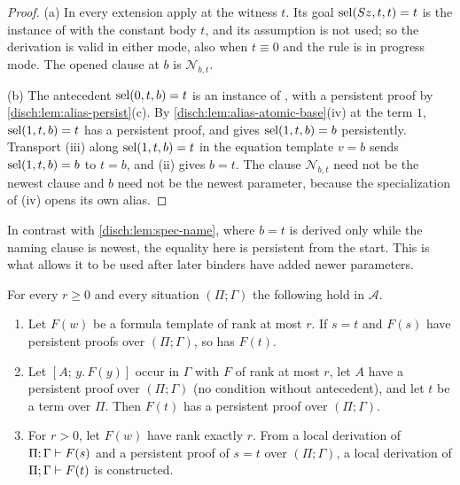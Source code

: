 \begin{proof}
(a) In every extension apply  at the witness $t$. Its goal
$\operatorname{sel}(S z,t,t)=t$ is the instance of  with the constant
body $t$, and its assumption is not used; so the derivation is valid in
either mode, also when $t\equiv 0$ and the rule is in progress mode. The
opened clause at $b$ is $\mathcal N_{b,t}$.

(b) The antecedent $\operatorname{sel}(0,t,b)=t$ is an instance of , with a
persistent proof by \cref{disch:lem:alias-persist}(c). By
\cref{disch:lem:alias-atomic-base}(iv) at the term $1$,
$\operatorname{sel}(1,t,b)=t$ has a persistent proof, and  gives
$\operatorname{sel}(1,t,b)=b$ persistently. Transport (iii) along $\operatorname{sel}(1,t,b)=t$ in the
equation template $v=b$ sends $\operatorname{sel}(1,t,b)=b$ to $t=b$, and (ii) gives
$b=t$. The clause $\mathcal N_{b,t}$ need not be the newest clause and $b$
need not be the newest parameter, because the specialization of (iv) opens
its own alias.
\end{proof}

In contrast with \cref{disch:lem:spec-name}, where $b=t$ is derived only
while the naming clause is newest, the equality here is persistent from the
start. This is what allows it to be used after later binders have added
newer parameters.

\begin{theorem}
\label{disch:thm:alias-rank}
For every $r\geq 0$ and every situation $(\Pi;\Gamma)$ the following hold
in $\mathcal A$.
\begin{enumerate}[label=\textup{(\alph*)}]
\item[$(\mathrm T_r)$] Let $F(w)$ be a formula template of rank at most
 $r$. If $s=t$ and $F(s)$ have persistent proofs over $(\Pi;\Gamma)$, so
 has $F(t)$.
\item[$(\mathrm S_r)$] Let $[A;\,y.\,F(y)]$ occur in $\Gamma$ with $F$ of
 rank at most $r$, let $A$ have a persistent proof over $(\Pi;\Gamma)$
 (no condition without antecedent), and let $t$ be a term over $\Pi$. Then
 $F(t)$ has a persistent proof over $(\Pi;\Gamma)$.
\item[$(\mathrm L_r)$] For $r>0$, let $F(w)$ have rank exactly $r$. From a
 local derivation of $\Pi;\Gamma\vdash F(s)$ and a persistent proof of
 $s=t$ over $(\Pi;\Gamma)$, a local derivation of
 $\Pi;\Gamma\vdash F(t)$ is constructed.
\end{enumerate}
\end{theorem}

